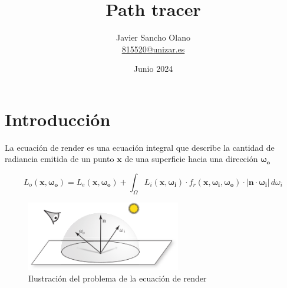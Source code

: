 \documentclass{article}
\title{Path tracer}
\author{Javier Sancho Olano \\ \href{mailto:815520@unizar.es}{815520@unizar.es}}
\date{Junio 2024}
\begin{document}
\maketitle

\tableofcontents
\newpage

\section{Introducción}
La ecuación de render es una ecuación integral que describe la cantidad de
radiancia emitida de un punto \(\mathbf{x}\) de una superficie hacia una
dirección \(\mathbf{\omega_{o}}\)

\begin{equation}
  L_o(\mathbf{x}, \mathbf{\omega_{o}}) = L_e(\mathbf{x}, \mathbf{\omega_{o}}) + \int_{\Omega} L_i(\mathbf{x}, \mathbf{\omega_{i}}) \cdot f_r(\mathbf{x}, \mathbf{\omega_{i}}, \mathbf{\omega_{o}}) \cdot  |\mathbf{n} \cdot \mathbf{\omega_{i}}| \, d\omega_{i}
\end{equation}

\begin{figure}[h]
  \centering \includegraphics[width=0.6\textwidth]{imgs/rendereq.png}
  \caption{Ilustración del problema de la ecuación de render}
\end{figure}
\end{document}

